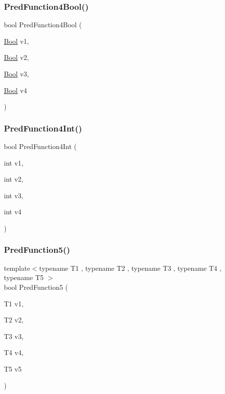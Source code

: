 \subsubsection{\texorpdfstring{PredFunction4Bool()}{PredFunction4Bool()}}
{\footnotesize\ttfamily bool Pred\+Function4\+Bool (\begin{DoxyParamCaption}\item[{\mbox{\hyperlink{struct_bool}{Bool}}}]{v1,  }\item[{\mbox{\hyperlink{struct_bool}{Bool}}}]{v2,  }\item[{\mbox{\hyperlink{struct_bool}{Bool}}}]{v3,  }\item[{\mbox{\hyperlink{struct_bool}{Bool}}}]{v4 }\end{DoxyParamCaption})}

\mbox{\label{googletest-master_2googletest_2test_2gtest__pred__impl__unittest_8cc_a105a045112a34fb2b65360c0d5daf81e}} 
\subsubsection{\texorpdfstring{PredFunction4Int()}{PredFunction4Int()}}
{\footnotesize\ttfamily bool Pred\+Function4\+Int (\begin{DoxyParamCaption}\item[{int}]{v1,  }\item[{int}]{v2,  }\item[{int}]{v3,  }\item[{int}]{v4 }\end{DoxyParamCaption})}

\mbox{\label{googletest-master_2googletest_2test_2gtest__pred__impl__unittest_8cc_aacb9302c548682f154ddf1a02a23a99f}} 
\subsubsection{\texorpdfstring{PredFunction5()}{PredFunction5()}}
{\footnotesize\ttfamily template$<$typename T1 , typename T2 , typename T3 , typename T4 , typename T5 $>$ \\
bool Pred\+Function5 (\begin{DoxyParamCaption}\item[{T1}]{v1,  }\item[{T2}]{v2,  }\item[{T3}]{v3,  }\item[{T4}]{v4,  }\item[{T5}]{v5 }\end{DoxyParamCaption})}

